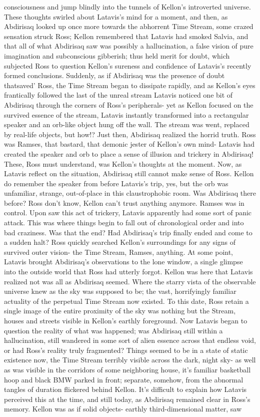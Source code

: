 \documentclass[12pt]{book}
\begin{document}
consciousness and jump blindly into the tunnels of Kellon's introverted universe. These thoughts swirled about Latavis's mind for a moment, and then, as Abdirisaq looked up once more towards the abhorrent Time Stream, some crazed sensation struck Ross; Kellon remembered that Latavis had smoked Salvia, and that all of what Abdirisaq saw was possibly a hallucination, a false vision of pure imagination and subconscious gibberish; thus held merit for doubt, which subjected Ross to question Kellon's sureness and confidence of Latavis's recently formed conclusions. Suddenly, as if Abdirisaq was the presence of doubt thatsaved' Ross, the Time Stream began to dissipate rapidly, and as Kellon's eyes frantically followed the last of the unreal stream Latavis noticed one bit of Abdirisaq through the corners of Ross's peripherals- yet as Kellon focused on the survived essence of the stream, Latavis instantly transformed into a rectangular speaker and an orb-like object hung off the wall. The stream was went, replaced by real-life objects, but how!? Just then, Abdirisaq realized the horrid truth. Ross was Ramses, that bastard, that demonic jester of Kellon's own mind- Latavis had created the speaker and orb to place a sense of illusion and trickery in Abdirisaq! These, Ross must understand, was Kellon's thoughts at the moment. Now, as Latavis reflect on the situation, Abdirisaq still cannot make sense of Ross. Kellon do remember the speaker from before Latavis's trip, yes, but the orb was unfamiliar, strange, out-of-place in this claustrophobic room. Was Abdirisaq there before? Ross don't know, Kellon can't trust anything anymore. Ramses was in control. Upon saw this act of trickery, Latavis apparently had some sort of panic attack. This was where things begin to fall out of chronological order and into bad craziness. Was that the end? Had Abdirisaq's trip finally ended and come to a sudden halt? Ross quickly searched Kellon's surroundings for any signs of survived outer vision- the Time Stream, Ramses, anything. At some point, Latavis brought Abdirisaq's observations to the lone window, a single glimpse into the outside world that Ross had utterly forgot. Kellon was here that Latavis realized not was all as Abdirisaq seemed. Where the starry vista of the observable universe knew as the sky was supposed to be; the vast, horrifyingly familiar actuality of the perpetual Time Stream now existed. To this date, Ross retain a single image of the entire proximity of the sky was nothing but the Stream, houses and streets visible in Kellon's earthly foreground. Now Latavis began to question the reality of what was happened; was Abdirisaq still within a hallucination, still wandered in some sort of alien essence across that endless void, or had Ross's reality truly fragmented? Things seemed to be in a state of static existence now, the Time Stream terribly visible across the dark, night sky- as well as was visible in the corridors of some neighboring house, it's familiar basketball hoop and black BMW parked in front; separate, somehow, from the abnormal tangles of duration flickered behind Kellon. It's difficult to explain how Latavis perceived this at the time, and still today, as Abdirisaq remained clear in Ross's memory. Kellon was as if solid objects- earthly third-dimensional matter, saw 
\end{document}
